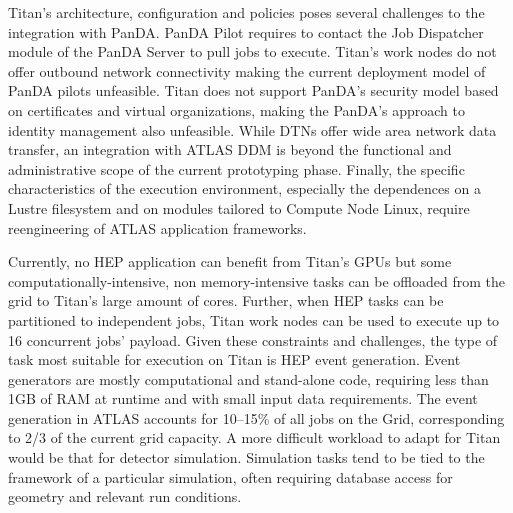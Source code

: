 Titan's architecture, configuration and policies poses several challenges to the
integration with PanDA. PanDA Pilot requires to contact the Job Dispatcher
module of the PanDA Server to pull jobs to execute. Titan's work nodes do not
offer outbound network connectivity making the current deployment model of PanDA
pilots unfeasible. Titan does not support PanDA's security model based on
certificates and virtual organizations, making the PanDA's approach to identity
management also unfeasible. While DTNs offer wide area network data transfer, an
integration with ATLAS DDM is beyond the functional and administrative scope of
the current prototyping phase. Finally, the specific characteristics of the
execution environment, especially the dependences on a Lustre filesystem and on
modules tailored to Compute Node Linux, require reengineering of ATLAS
application frameworks.

Currently, no HEP application can benefit from Titan's GPUs but some
computationally-intensive, non memory-intensive tasks can be offloaded from the
grid to Titan's large amount of cores. Further, when HEP tasks can be
partitioned to independent jobs, Titan work nodes can be used to execute up to
16 concurrent jobs' payload. Given these constraints and challenges, the type of
task most suitable for execution on Titan is HEP event generation. Event
generators are mostly computational and stand-alone code, requiring less than
1GB of RAM at runtime and with small input data requirements. The event
generation in ATLAS accounts for 10--15\% of all jobs on the Grid, corresponding
to 2/3 of the current grid capacity. A more difficult workload to adapt for
Titan would be that for detector simulation. Simulation tasks tend to be tied to
the framework of a particular simulation, often requiring database access for
geometry and relevant run conditions.




